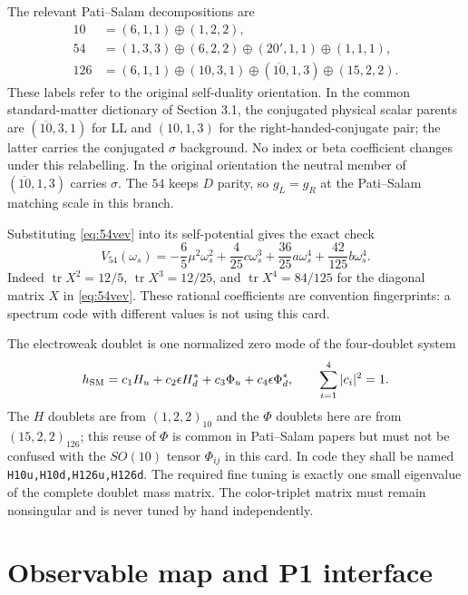 \documentclass[11pt]{article}
\newcommand{\tr}{\operatorname{tr}}
\begin{document}
The relevant Pati--Salam decompositions are
\begin{align}
10&=(6,1,1)\oplus(1,2,2),\\
54&=(1,3,3)\oplus(6,2,2)\oplus(20',1,1)\oplus(1,1,1),\\
126&=(6,1,1)\oplus(10,3,1)\oplus(\overline{10},1,3)
 \oplus(15,2,2).
\end{align}
These labels refer to the original self-duality orientation. In the common
standard-matter dictionary of Section 3.1, the conjugated physical scalar
parents are $(\overline{10},3,1)$ for LL and $(10,1,3)$ for the
right-handed-conjugate pair; the latter carries the conjugated $\sigma$
background. No index or beta coefficient changes under this relabelling.
In the original orientation the neutral member of $(\overline{10},1,3)$
carries $\sigma$. The $54$ keeps $D$ parity, so $g_L=g_R$ at the
Pati--Salam matching scale in this branch.

Substituting \eqref{eq:54vev} into its self-potential gives the exact check
\begin{equation}
 V_{54}(\omega_s)=-\frac65\mu^2\omega_s^2
 +\frac4{25}c\omega_s^3
 +\frac{36}{25}a\omega_s^4
 +\frac{42}{125}b\omega_s^4.
 \label{eq:54radial}
\end{equation}
Indeed $\tr X^2=12/5$, $\tr X^3=12/25$, and
$\tr X^4=84/125$ for the diagonal matrix $X$ in
\eqref{eq:54vev}.  These rational coefficients are convention fingerprints:
a spectrum code with different values is not using this card.

The electroweak doublet is one normalized zero mode of the four-doublet
system
\begin{equation}
 h_{\rm SM}=c_1 H_u+c_2\epsilon H_d^*+c_3\Phi_u
 +c_4\epsilon\Phi_d^*,\qquad \sum_{i=1}^4|c_i|^2=1.
 \label{eq:lightdoublet}
\end{equation}
The $H$ doublets are from $(1,2,2)_{10}$ and the $\Phi$ doublets here are
from $(15,2,2)_{126}$; this reuse of $\Phi$ is common in Pati--Salam papers
but must not be confused with the $SO(10)$ tensor $\Phi_{ij}$ in this card.
In code they shall be named \texttt{H10u,H10d,H126u,H126d}.  The required
fine tuning is exactly one small eigenvalue of the complete doublet mass
matrix.  The color-triplet matrix must remain nonsingular and is never tuned
by hand independently.

\section{Observable map and P1 interface}
\end{document}
